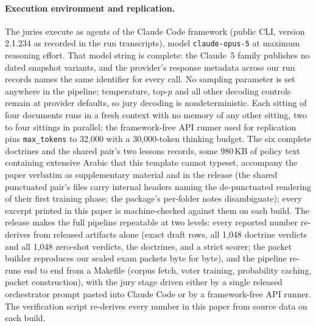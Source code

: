 \documentclass[11pt]{article}
\begin{document}
\paragraph{Execution environment and replication.} The juries execute as agents of the
Claude Code framework (public CLI, version 2.1.234 as recorded in the run transcripts),
model \texttt{claude-opus-5} at maximum reasoning effort. That model string is
complete: the Claude~5 family publishes no dated snapshot variants, and the provider's
response metadata across our run records names the same identifier for every call. No
sampling parameter is set anywhere in the pipeline; temperature, top-$p$ and all other
decoding controls remain at provider defaults, so jury decoding is nondeterministic.
Each sitting of four documents runs in a fresh context with no memory of any other
sitting, two to four sittings in parallel; the framework-free API runner used for
replication pins \texttt{max\_tokens} to 32{,}000 with a 30{,}000-token thinking
budget. The six complete doctrines and the shared pair's two lessons records, some 980\,KB of policy text
containing extensive Arabic that this template cannot typeset, accompany the paper
verbatim as supplementary material and in the release (the shared punctuated pair's
files carry internal headers naming the de-punctuated rendering of their first
training phase; the package's per-folder notes disambiguate); every excerpt printed in this
paper is machine-checked against them on each build. The release makes the full
pipeline repeatable at two levels: every reported number re-derives from released
artifacts alone (exact draft rows, all 1{,}048 doctrine verdicts and all 1{,}048
zero-shot verdicts, the doctrines, and a strict scorer; the packet builder reproduces
our sealed exam packets byte for byte), and the pipeline re-runs end to end from a
Makefile (corpus fetch, voter training, probability caching, packet construction), with
the jury stage driven either by a single released orchestrator prompt pasted into
Claude Code or by a framework-free API runner. The verification script re-derives every
number in this paper from source data on each build.
\end{document}
